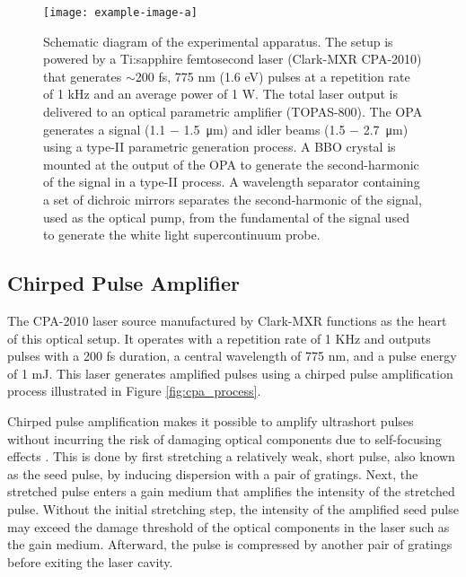 \begin{figure}[ht]
	\centering
	\texttt{[image: example-image-a]}
	\caption{Schematic diagram of the experimental apparatus. The setup is powered by a Ti:sapphire femtosecond laser (Clark-MXR CPA-2010) that generates $\sim$200 fs, 775 nm (1.6 eV) pulses at a repetition rate of 1 kHz and an average power of 1 W. The total laser output is delivered to an optical parametric amplifier (TOPAS-800). The OPA generates a signal (1.1 $-$ \SI{1.5}{\micro\meter}) and idler beams (1.5 $-$ \SI{2.7}{\micro\meter}) using a type-II parametric generation process.  A BBO crystal is mounted at the output of the OPA to generate the second-harmonic of the signal in a type-II process. A wavelength separator containing a set of dichroic mirrors separates the second-harmonic of the signal, used as the optical pump, from the fundamental of the signal used to generate the white light supercontinuum probe.}
	\label{fig:setup_schematic}
\end{figure}


\subsection{Chirped Pulse Amplifier}
The CPA-2010 laser source manufactured by Clark-MXR functions as the heart of this optical setup. It operates with a repetition rate of 1 KHz and outputs pulses with a 200 fs duration, a central wavelength of 775 nm, and a pulse energy of 1 mJ. This laser generates amplified pulses using a chirped pulse amplification process illustrated in Figure \ref{fig:cpa_process}.

Chirped pulse amplification makes it possible to amplify ultrashort pulses without incurring the risk of damaging optical components due to self-focusing effects \cite{strickland1985compression}. This is done by first stretching a relatively weak, short pulse, also known as the seed pulse, by inducing dispersion with a pair of gratings. Next, the stretched pulse enters a gain medium that amplifies the intensity of the stretched pulse. Without the initial stretching step, the intensity of the amplified seed pulse may exceed the damage threshold of the optical components in the laser such as the gain medium. Afterward, the pulse is compressed by another pair of gratings before exiting the laser cavity.

